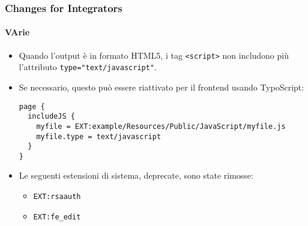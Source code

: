 \begin{frame}[fragile]
	\frametitle{Changes for Integrators}
	\framesubtitle{VArie}

	\lstset{basicstyle=\tiny\ttfamily}

	\begin{itemize}

		\item Quando l'output è in formato HTML5, i tag \texttt{<script>} non includono più
			l'attributo \texttt{type="text/javascript"}.

		\item Se necessario, questo può essere riattivato per il frontend usando TypoScript:

\begin{lstlisting}
page {
  includeJS {
    myfile = EXT:example/Resources/Public/JavaScript/myfile.js
    myfile.type = text/javascript
  }
}
\end{lstlisting}

		\item Le seguenti estensioni di sistema, deprecate, sono state rimosse:

			\begin{itemize}
				\item \texttt{EXT:rsaauth}
				\item \texttt{EXT:fe\_edit}
			\end{itemize}

	\end{itemize}

\end{frame}

